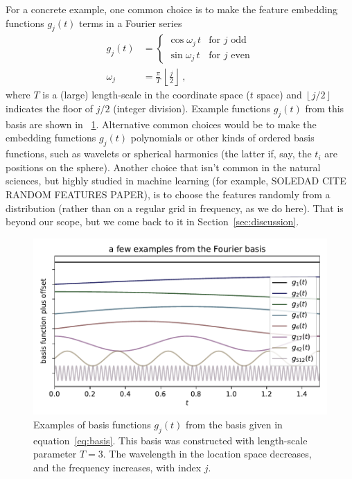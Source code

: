 \documentclass[12pt,letterpaper]{article}
\newlength{\figurewidth}
\newcommand{\floor}[1]{\left\lfloor #1 \right\rfloor}
\newcommand{\sectionname}{Section}
\begin{document}
For a concrete example, one common choice is to make the feature embedding functions $g_j(t)$ terms in a Fourier series
\begin{align}\label{eq:basis}
    g_j(t) &= \left\{\begin{array}{ll}
            \cos\omega_j\,t & \mbox{for $j$ odd} \\
            \sin\omega_j\,t & \mbox{for $j$ even}\end{array}\right.
    \\
    \omega_j &= \frac{\pi}{T}\,\floor{\frac{j}{2}}
    ~,
\end{align}
where $T$ is a (large) length-scale in the coordinate space ($t$ space) and $\floor{j/2}$ indicates the floor of $j/2$ (integer division).
Example functions $g_j(t)$ from this basis are shown in \figurename~\ref{fig:basis}.
Alternative common choices would be to make the embedding fumctions $g_j(t)$ polynomials or other kinds of ordered basis functions, such as wavelets or spherical harmonics (the latter if, say, the $t_i$ are positions on the sphere).
Another choice that isn't common in the natural sciences, but highly studied in machine learning (for example, SOLEDAD CITE RANDOM FEATURES PAPER), is to choose the features randomly from a distribution (rather than on a regular grid in frequency, as we do here). That is beyond our scope, but we come back to it in \sectionname~\ref{sec:discussion}.
\begin{figure}[t]
    \begin{mdframed}
    \includegraphics[width=\figurewidth]{paper/fourier.pdf}
    \caption{Examples of basis functions $g_j(t)$ from the basis given in equation~\eqref{eq:basis}. This basis was constructed with length-scale parameter $T=3$. The wavelength in the location space decreases, and the frequency increases, with index $j$.}
    \label{fig:basis}
    \end{mdframed}
\end{figure}
\end{document}
